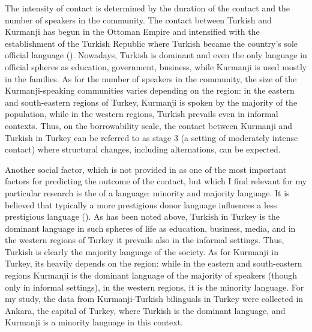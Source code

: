\documentclass[output=paper,colorlinks,citecolor=brown]{langscibook}
\begin{document}
The intensity of contact is determined by the duration of the contact and the number of speakers in the community. The contact between Turkish and Kurmanji has begun in the Ottoman Empire and intensified with the establishment of the Turkish Republic where Turkish became the country's sole official language (\citealt{yagmur2001languages}). Nowadays, Turkish is dominant and even the only language in official spheres as education, government, business, while Kurmanji is used mostly in the families. As for the number of speakers in the community, the size of the Kurmanji-speaking communities varies depending on the region: in the eastern and south-eastern regions of Turkey, Kurmanji is spoken by the majority of the population, while in the western regions, Turkish prevails even in informal contexts. Thus, on the borrowability scale, the contact between Kurmanji and Turkish in Turkey can be referred to as stage 3 (a setting of moderately intense contact) where structural changes, including  alternations, can be expected. 

Another social factor, which is not provided in \citet{thomason1988language} as one of the most important factors for predicting the outcome of the contact, but which I find relevant for my particular research is the  of a language: minority and majority language. It is believed that typically a more prestigious donor language influences a less prestigious  language (\citealt{johanson2002structural}). As has been noted above, Turkish in Turkey is the dominant language in such spheres of life as education, business, media, and in the western regions of Turkey it prevails also in the informal settings. Thus, Turkish is clearly the majority language of the society. As for Kurmanji in Turkey, its  heavily depends on the region: while in the eastern and south-eastern regions Kurmanji is the dominant language of the majority of speakers (though only in informal settings), in the western regions, it is the minority language. For my study, the data from Kurmanji-Turkish bilinguals in Turkey were collected in Ankara, the capital of Turkey, where Turkish is the dominant language, and Kurmanji is a minority language in this context. 
\end{document}
